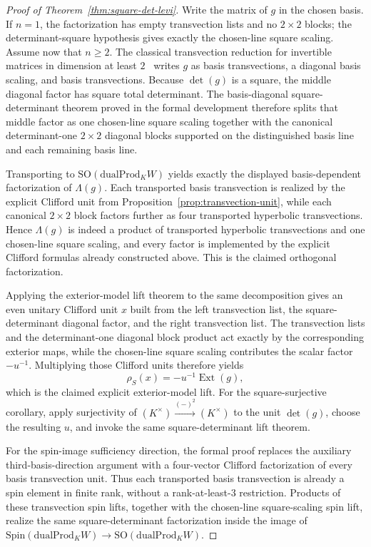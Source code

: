 \documentclass{birkjour}
\theoremstyle{plain}
\theoremstyle{definition}
\theoremstyle{remark}
\newcommand{\Spin}{\mathrm{Spin}}
\newcommand{\SO}{\mathrm{SO}}
\newcommand{\dualProd}{\mathrm{dualProd}}
\newcommand{\ExtMap}{\operatorname{Ext}}
\begin{document}
\begin{proof}[Proof of Theorem~{}\ref{thm:square-det-levi}]
Write the matrix of $g$ in the chosen basis. If \(n=1\), the factorization has
empty transvection lists and no \(2\times2\) blocks; the determinant-square
hypothesis gives exactly the chosen-line square scaling. Assume now that
\(n\ge2\). The classical transvection reduction for invertible matrices in
dimension at least $2$~{}\cite[Ch.~IV]{Artin1957GeometricAlgebra} writes $g$ as
basis transvections, a diagonal basis scaling, and basis transvections. Because
$\det(g)$ is a square, the middle diagonal factor has square total determinant.
The basis-diagonal square-determinant theorem proved in the formal development
therefore splits that middle factor as one chosen-line square scaling together
with the canonical determinant-one $2\times2$ diagonal blocks supported on the
distinguished basis line and each remaining basis line.

Transporting to $\SO(\dualProd_K W)$ yields exactly the displayed basis-dependent
factorization of $\Lambda(g)$. Each transported basis transvection is realized
by the explicit Clifford unit from Proposition~{}\ref{prop:transvection-unit},
while each canonical $2\times2$ block factors further as four transported
hyperbolic transvections. Hence $\Lambda(g)$ is indeed a product of transported
hyperbolic transvections and one chosen-line square scaling, and every factor is
implemented by the explicit Clifford formulas already constructed above. This is
the claimed orthogonal factorization.

Applying the exterior-model lift theorem to the same decomposition gives an even
unitary Clifford unit $x$ built from the left transvection list, the
square-determinant diagonal factor, and the right transvection list. The
transvection lists and the determinant-one diagonal block product act exactly by
the corresponding exterior maps, while the chosen-line square scaling
contributes the scalar factor $-u^{-1}$. Multiplying those Clifford units
therefore yields
\[
  \rho_S(x)=-u^{-1}\ExtMap(g),
\]
which is the claimed explicit exterior-model lift.
For the square-surjective corollary, apply surjectivity of
\((K^\times)\xrightarrow{(-)^2}(K^\times)\) to the unit \(\det(g)\), choose
the resulting $u$, and invoke the same square-determinant lift theorem.

For the spin-image sufficiency direction, the formal proof replaces the auxiliary
third-basis-direction argument with a four-vector Clifford factorization of every
basis transvection unit. Thus each transported basis transvection is already a
spin element in finite rank, without a rank-at-least-$3$ restriction. Products
of these transvection spin lifts, together with the chosen-line square-scaling
spin lift, realize the same square-determinant factorization inside the image of
\(\Spin(\dualProd_K W)\to\SO(\dualProd_K W)\).


\end{proof}
\end{document}

